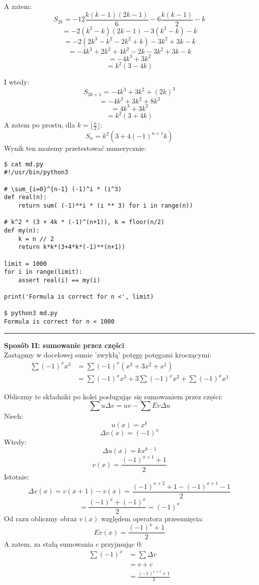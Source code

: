 \documentclass{article}
\newcommand{\desc}[2]{#1^{\underline{#2}}}
\begin{document}
A zatem:
\[S_{2k} = -12 \frac{k(k-1)(2k-1)}{6} -6\frac{k(k-1)}{2} - k\]
\[=-2(k^2-k)(2k-1) -3(k^2-k) - k\]
\[=-2(2k^3 - k^2 - 2k^2 + k) -3k^2 +3k - k\]
\[=-4k^3 +2k^2 +4k^2 -2k -3k^2 +3k - k\]
\[=-4k^3 +3k^2\]
\[=k^2(3 - 4k)\]

I wtedy:
\[S_{2k+1} = -4k^3 +3k^2 + (2k)^3\]
\[=-4k^3+3k^2 +8k^3\]
\[=4k^3+3k^2\]
\[=k^2(3+4k)\]
A zatem po prostu, dla $k = \lfloor{\frac{n}{2}}\rfloor$:
\[S_n = k^2 (3 + 4 (-1)^{n+1}k)\]
Wynik ten możemy przetestować numerycznie:
\begin{verbatim}
$ cat md.py
#!/usr/bin/python3

# \sum_{i=0}^{n-1} (-1)^i * (i^3)
def real(n):
    return sum( (-1)**i * (i ** 3) for i in range(n))

# k^2 * (3 + 4k * (-1)^(n+1)), k = floor(n/2)
def my(n):
    k = n // 2
    return k*k*(3+4*k*(-1)**(n+1))

limit = 1000
for i in range(limit):
    assert real(i) == my(i)

print('Formula is correct for n <', limit)

$ python3 md.py
Formula is correct for n < 1000
\end{verbatim}



\rule{\textwidth}{1pt}
\bigskip

\textbf{Sposób II: sumowanie przez części} \\
Zastąpmy w docelowej sumie 'zwykłą' potęgę potęgami kroczącymi:
\begin{align*}
\sum (-1)^x x^3 &= \sum (-1)^x (\desc{x}{3} + 3\desc{x}{2} + \desc{x}{1}) \\
&= \sum (-1)^x \desc{x}{3} + 3\sum (-1)^x \desc{x}{2} + \sum (-1)^x \desc{x}{1}
\end{align*}

Obliczmy te składniki po kolei posługując się sumowaniem przez części:
\[\sum u \Delta v = uv - \sum Ev \Delta u\]
Niech:
\[u(x) = \desc{x}{k}\]
\[\Delta v(x) = (-1)^x\]
Wtedy:
\[\Delta u(x) = k\desc{x}{k-1}\]
\[v(x) = \frac{(-1)^{x+1}+1}{2}\]
Istotnie:
\[\Delta v(x) = v(x+1) - v(x) = \frac{(-1)^{x+2}+1 - (-1)^{x+1}-1}{2}\]
\[=\frac{(-1)^x + (-1)^x}{2} = (-1)^x\]
Od razu obliczmy obraz $v(x)$ względem operatora przesunięcia:
\[Ev(x) = \frac{(-1)^x+1}{2}\]
A zatem, za stałą sumowania $c$ przyjmując 0:
\begin{align*}
\sum (-1)^x &= \sum \Delta v \\
&= v +c\\
&= \frac{(-1)^{x+1}+1}{2}
\end{align*}
\end{document}
